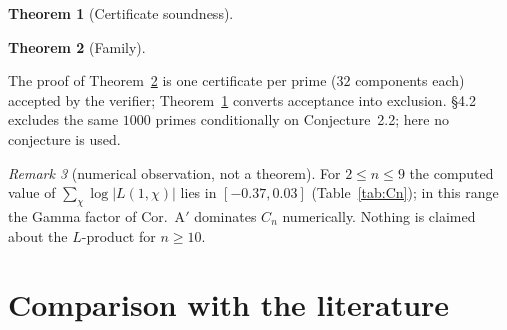 \documentclass[11pt]{amsart}
\newtheorem{theorem}{Theorem}[section]
\theoremstyle{remark}\newtheorem{remark}[theorem]{Remark}
\theoremstyle{definition}\newtheorem{definition}[theorem]{Definition}
\providecommand{\proofsdir}{../../proofs} %
\begin{document}
\begin{theorem}[Certificate soundness]\label{thm:cert}

\end{theorem}
\begin{theorem}[Family]\label{thm:family}

\end{theorem}
The proof of Theorem~\ref{thm:family} is one certificate per prime ($32$ components each) accepted by the verifier; Theorem~\ref{thm:cert} converts acceptance into exclusion. \cite{KY} \S4.2 excludes the same $1000$ primes conditionally on Conjecture~2.2; here no conjecture is used.

\begin{remark}[numerical observation, not a theorem]\label{rem:Lprod}
For $2\le n\le9$ the computed value of $\sum_\chi\log|L(1,\chi)|$ lies in $[-0.37,0.03]$ (Table~\ref{tab:Cn}); in this range the Gamma factor of Cor.~A$'$ dominates $C_n$ numerically. Nothing is claimed about the $L$-product for $n\ge10$.
\end{remark}

\section{Comparison with the literature}\label{sec:comp}
\end{document}
